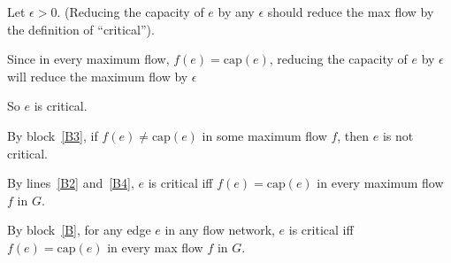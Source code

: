 \documentclass[10pt]{article}
\begin{document}
\begin{problems}
\begin{longFormProof}
\begin{block}[B]
\begin{block}[B3]
        \step Let $\epsilon>0$. (Reducing the capacity of $e$ by any $\epsilon$ should reduce the max flow by the definition of ``critical'').

        \step Since in every maximum flow, $f(e) = \text{cap}(e)$, reducing the capacity 
              of $e$ by $\epsilon$ will reduce the maximum flow by $\epsilon$

        \step So $e$ is critical.
      \end{block}

      \step[B4] By block~\ref{B3}, if $f(e) \ne \text{cap}(e)$ in some maximum flow $f$,
      then $e$ is not critical.

      \smallskip

      \lineacross 
    
      \step By lines~\ref{B2} and~\ref{B4},
      $e$ is critical iff $f(e) = \text{cap}(e)$ in every maximum flow $f$ in $G$.
    \end{block}

    \step By block~\ref{B},
    for any edge $e$ in any flow network,
    $e$ is critical iff $f(e) = \text{cap}(e)$ in every max flow $f$ in $G$.
  \end{longFormProof}

\end{problems}
\end{document}
